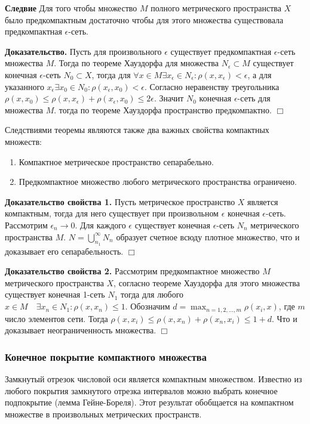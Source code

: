 \documentclass[12pt]{report}
\newcommand{\be}{\begin{enumerate}}
\newcommand{\ee}{\end{enumerate}}
\renewcommand{\[}{$\\\displaystyle}
\renewcommand{\]}{\\$}
\renewcommand{\[}{$\\\displaystyle}
\newcommand{\btev}[1][]{\textbf{Доказательство#1.}
}
\newcommand{\etev}{$\Box$}
\begin{document}
\textbf{Следвие} Для того чтобы множество $M$ полного метрического пространства $X$ было предкомпактным достаточно чтобы для этого множества существовала предкомпактная $\epsilon$-сеть.

\btev[] Пусть для произвольного $\epsilon$ существует предкомпактная $\epsilon$-сеть множества $M$. Тогда по теореме Хауздорфа для множества $N_\epsilon \subset M$ существует конечная $\epsilon$-сеть $N_0 \subset X$, тогда для $\forall x \in M \exists x_\epsilon \in N_\epsilon: \rho(x,x_\epsilon) < \epsilon$, а для указанного $x_\epsilon \exists x_0\in N_0: \rho(x_\epsilon,x_0)<\epsilon$. Согласно неравенству треугольника $\rho(x,x_0)\leq \rho(x,x_\epsilon) + \rho(x_\epsilon,x_0) \leq 2\epsilon$. Значит $N_0$ конечная $\epsilon$-сеть для множества $M$. тогда по теореме Хауздорфа пространство предкомпактно. \etev

Следствиями теоремы являются также два важных свойства компактных множеств:

\be
  \item Компактное метрическое пространство сепарабельно.
  \item Предкомпактное множество любого метрического пространства ограничено.
\ee

\btev[ свойства 1] Пусть метрическое пространство $X$ является компактным, тогда для него существует при произвольном $\epsilon$ конечная $\epsilon$-сеть. Рассмотрим $\epsilon_n \rightarrow 0$. Для каждого $\epsilon$ существует конечная $\epsilon$-сеть $N_n$ метрического пространства $M$. $N=\bigcup _{n_1}^{\infty} N_n$ образует счетное всюду плотное множество, что и доказывает его сепарабельность. \etev

\btev[ свойства 2] Рассмотрим предкомпактное множество $M$ метрического пространства $X$, согласно теореме Хауздорфа для этого множества существует конечная 1-сеть $N_1$ тогда для любого $x \in M\quad \exists x_n \in N_1: \rho(x, x_n) \leq 1$. Обозначим $d=\max_{n=1,2,\dots,m}\rho(x_i,x)$, где $m$ число элементов сети. Тогда $\rho(x, x_i) \leq \rho(x, x_n)+\rho(x_n, x_i) \leq 1+d$. Что и доказывает неограниченность множества. \etev

\subsubsection{Конечное покрытие компактного множества}

Замкнутый отрезок числовой оси является компактным множеством. Известно из любого покрытия замкнутого отрезка интервалов можно выбрать конечное подпокрытие (лемма Гейне-Бореля). Этот результат обобщается на компактном множестве в произвольных метрических пространств.
\end{document}
